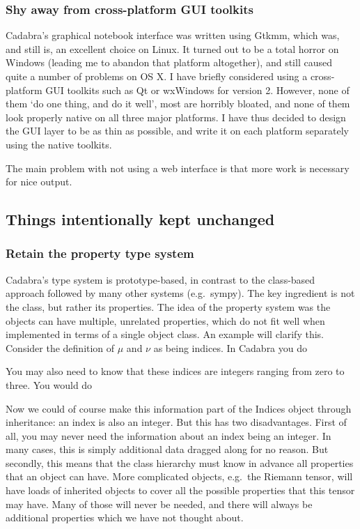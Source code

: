 \documentclass[11pt]{article}
\begin{document}
\subsubsection{Shy away from cross-platform GUI toolkits}

Cadabra's graphical notebook interface was written using Gtkmm, which
was, and still is, an excellent choice on Linux. It turned out to be a
total horror on Windows (leading me to abandon that platform
altogether), and still caused quite a number of problems on OS X.  I
have briefly considered using a cross-platform GUI toolkits such as Qt
or wxWindows for version 2. However, none of them `do one thing, and
do it well', most are horribly bloated, and none of them look properly
native on all three major platforms. I have thus decided to design the
GUI layer to be as thin as possible, and write it on each platform
separately using the native toolkits.

The main problem with not using a web interface is that more work is
necessary for nice output. 

\subsection{Things intentionally kept unchanged}
\subsubsection{Retain the property type system}

Cadabra's type system is prototype-based, in contrast to the
class-based approach followed by many other systems (e.g.~sympy). 
The key ingredient is not the class, but rather its properties.
The idea of the property system was the objects can have multiple,
unrelated properties, which do not fit well when implemented in terms
of a single object class. An example will clarify this. Consider the
definition of $\mu$ and $\nu$ as being indices. In Cadabra you do
\begin{quote}
\end{quote}
You may also need to know that these indices are integers ranging from
zero to three. You would do
\begin{quote}
\end{quote}
Now we could of course make this information part of the Indices
object through inheritance: an index is also an integer. But this has
two disadvantages. First of all, you may never need the information
about an index being an integer. In many cases, this is simply
additional data dragged along for no reason. But secondly, this means
that the class hierarchy must know in advance all properties that an
object can have. More complicated objects, e.g.~the Riemann tensor,
will have loads of inherited objects to cover all the possible
properties that this tensor may have. Many of those will never be
needed, and there will always be additional properties which we have
not thought about. 
\end{document}
